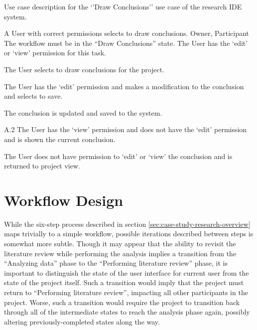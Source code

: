 \documentclass[document.tex]{subfiles}
\begin{document}
\begin{table}
  \centering
  \caption{Use case description for the `'Draw Conclusions'' use case of the research IDE system.}
  \label{tbl:use-case-draw-conclusions}

  \begin{usecase}
    A User with correct permissions selects to draw conclusions.
    Owner, Participant
    The workflow must be in the “Draw Conclusions” state. The User has the ‘edit’ or ‘view’ permission for this task.
    \ucnormal
    \begin{ucenum}
      \item The User selects to draw conclusions for the project.
      \item The User has the ‘edit’ permission and makes a modification to the conclusion and selects to save.
      \item The conclusion is updated and saved to the system.
    \end{ucenum}
    \begin{ucenum}
      \item [A.2] The User has the ‘view’ permission and does not have the ‘edit’ permission and is shown the current conclusion.
    \end{ucenum}
    The User does not have permission to ‘edit’ or ‘view’ the conclusion and is returned to project view.
  \end{usecase}
\end{table}

\FloatBarrier

\section {Workflow Design}
\label{sec:case-research-workflow-design}

While the six-step process described in section \ref{sec:case-study-research-overview} maps trivially to a simple workflow, possible iterations described between steps is somewhat more subtle. Though it may appear that the ability to revisit the literature review while performing the analysis implies a transition from the ``Analyzing data'' phase to the ``Performing literature review'' phase, it is important to distinguish the state of the user interface for current user from the state of the project itself. Such a transition would imply that the project must return to ``Performing literature review'', impacting all other participants in the project. Worse, such a transition would require the project to transition back through all of the intermediate states to reach the analysis phase again, possibly altering previously-completed states along the way.
\end{document}
